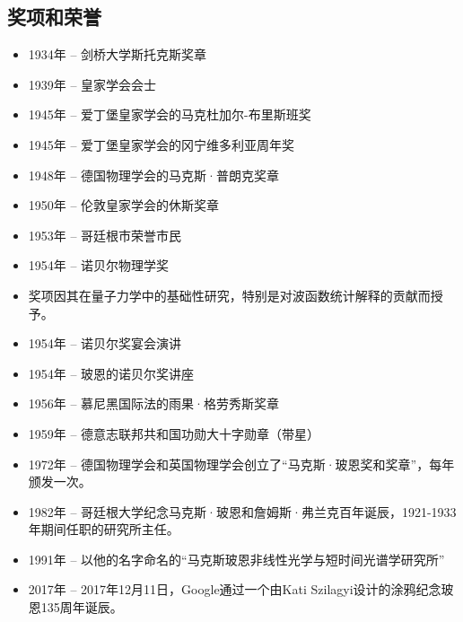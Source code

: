 \subsection{奖项和荣誉}
\begin{itemize}
\item 1934年 – 剑桥大学斯托克斯奖章  
\item 1939年 – 皇家学会会士  
\item 1945年 – 爱丁堡皇家学会的马克杜加尔-布里斯班奖  
\item 1945年 – 爱丁堡皇家学会的冈宁维多利亚周年奖  
\item 1948年 – 德国物理学会的马克斯·普朗克奖章  
\item 1950年 – 伦敦皇家学会的休斯奖章  
\item 1953年 – 哥廷根市荣誉市民  
\item 1954年 – 诺贝尔物理学奖  
  \item 奖项因其在量子力学中的基础性研究，特别是对波函数统计解释的贡献而授予。  
  \item 1954年 – 诺贝尔奖宴会演讲  
  \item 1954年 – 玻恩的诺贝尔奖讲座  
\item 1956年 – 慕尼黑国际法的雨果·格劳秀斯奖章  
\item 1959年 – 德意志联邦共和国功勋大十字勋章（带星）  
\item 1972年 – 德国物理学会和英国物理学会创立了“马克斯·玻恩奖和奖章”，每年颁发一次。  
\item 1982年 – 哥廷根大学纪念马克斯·玻恩和詹姆斯·弗兰克百年诞辰，1921-1933年期间任职的研究所主任。  
\item 1991年 – 以他的名字命名的“马克斯玻恩非线性光学与短时间光谱学研究所”  
\item 2017年 – 2017年12月11日，Google通过一个由Kati Szilagyi设计的涂鸦纪念玻恩135周年诞辰。
\end{itemize}  